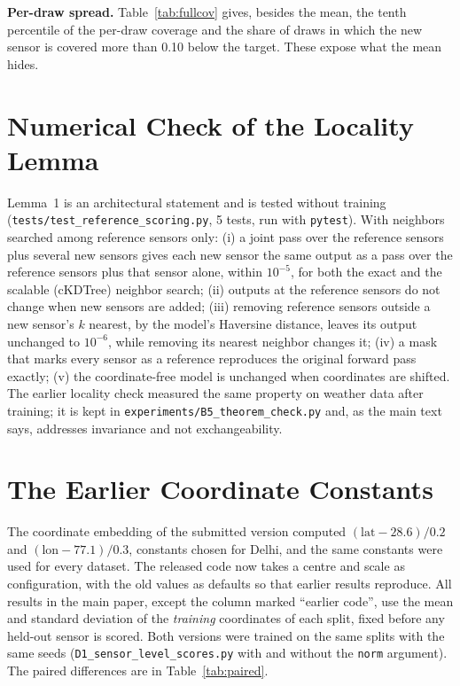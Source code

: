\documentclass[journal,onecolumn]{IEEEtran}
\begin{document}
\textbf{Per-draw spread.} Table~\ref{tab:fullcov} gives, besides the mean, the tenth percentile of the
per-draw coverage and the share of draws in which the new sensor is covered more than 0.10 below the
target. These expose what the mean hides.

\section{Numerical Check of the Locality Lemma}
Lemma~1 is an architectural statement and is tested without training
(\texttt{tests/test\_reference\_scoring.py}, 5 tests, run with \texttt{pytest}). With neighbors searched
among reference sensors only: (i) a joint pass over the reference sensors plus several new sensors gives
each new sensor the same output as a pass over the reference sensors plus that sensor alone, within
$10^{-5}$, for both the exact and the scalable (cKDTree) neighbor search; (ii) outputs at the reference
sensors do not change when new sensors are added; (iii) removing reference sensors outside a new
sensor's $k$ nearest, by the model's Haversine distance, leaves its output unchanged to $10^{-6}$, while
removing its nearest neighbor changes it; (iv) a mask that marks every sensor as a reference reproduces
the original forward pass exactly; (v) the coordinate-free model is unchanged when coordinates are
shifted. The earlier locality check measured the same property on weather data after training; it is
kept in \texttt{experiments/B5\_theorem\_check.py} and, as the main text says, addresses invariance
and not exchangeability.

\section{The Earlier Coordinate Constants}
The coordinate embedding of the submitted version computed $(\text{lat}-28.6)/0.2$ and
$(\text{lon}-77.1)/0.3$, constants chosen for Delhi, and the same constants were used for every dataset.
The released code now takes a centre and scale as configuration, with the old values as defaults so
that earlier results reproduce. All results in the main paper, except the column marked ``earlier
code'', use the mean and standard deviation of the \emph{training} coordinates of each split, fixed
before any held-out sensor is scored. Both versions were trained on the same splits with the same seeds
(\texttt{D1\_sensor\_level\_scores.py} with and without the \texttt{norm} argument). The paired
differences are in Table~\ref{tab:paired}.
\end{document}
